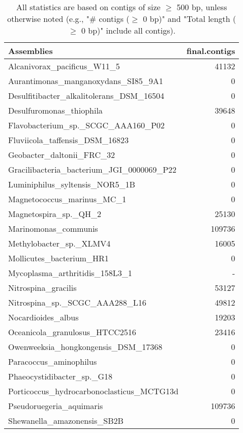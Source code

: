 \documentclass[12pt,a4paper]{article}
\begin{document}
\begin{table}[ht]
\begin{center}
\caption{All statistics are based on contigs of size $\geq$ 500 bp, unless otherwise noted (e.g., "\# contigs ($\geq$ 0 bp)" and "Total length ($\geq$ 0 bp)" include all contigs).}
\begin{tabular}{|l*{1}{|r}|}
\hline
Assemblies & final.contigs \\ \hline
Alcanivorax\_pacificus\_W11\_5 & 41132 \\ \hline
Aurantimonas\_manganoxydans\_SI85\_9A1 & 0 \\ \hline
Desulfitibacter\_alkalitolerans\_DSM\_16504 & 0 \\ \hline
Desulfuromonas\_thiophila & 39648 \\ \hline
Flavobacterium\_sp.\_SCGC\_AAA160\_P02 & 0 \\ \hline
Fluviicola\_taffensis\_DSM\_16823 & 0 \\ \hline
Geobacter\_daltonii\_FRC\_32 & 0 \\ \hline
Gracilibacteria\_bacterium\_JGI\_0000069\_P22 & 0 \\ \hline
Luminiphilus\_syltensis\_NOR5\_1B & 0 \\ \hline
Magnetococcus\_marinus\_MC\_1 & 0 \\ \hline
Magnetospira\_sp.\_QH\_2 & 25130 \\ \hline
Marinomonas\_communis & 109736 \\ \hline
Methylobacter\_sp.\_XLMV4 & 16005 \\ \hline
Mollicutes\_bacterium\_HR1 & 0 \\ \hline
Mycoplasma\_arthritidis\_158L3\_1 & - \\ \hline
Nitrospina\_gracilis & 53127 \\ \hline
Nitrospina\_sp.\_SCGC\_AAA288\_L16 & 49812 \\ \hline
Nocardioides\_albus & 19203 \\ \hline
Oceanicola\_granulosus\_HTCC2516 & 23416 \\ \hline
Owenweeksia\_hongkongensis\_DSM\_17368 & 0 \\ \hline
Paracoccus\_aminophilus & 0 \\ \hline
Phaeocystidibacter\_sp.\_G18 & 0 \\ \hline
Porticoccus\_hydrocarbonoclasticus\_MCTG13d & 0 \\ \hline
Pseudoruegeria\_aquimaris & 109736 \\ \hline
Shewanella\_amazonensis\_SB2B & 0 \\ \hline

\end{tabular}
\end{center}
\end{table}
\end{document}
